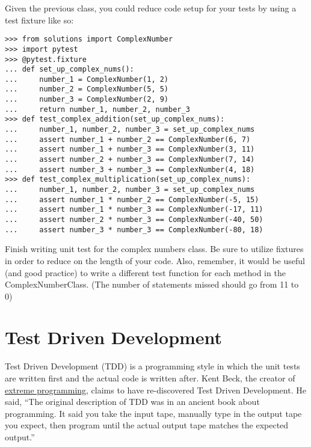 Given the previous class, you could reduce code setup for your tests by using a test fixture like so:

\begin{lstlisting}
>>> from solutions import ComplexNumber
>>> import pytest
>>> @pytest.fixture
... def set_up_complex_nums():
...     number_1 = ComplexNumber(1, 2)
...     number_2 = ComplexNumber(5, 5)
...     number_3 = ComplexNumber(2, 9)
...     return number_1, number_2, number_3
>>> def test_complex_addition(set_up_complex_nums):
...     number_1, number_2, number_3 = set_up_complex_nums
...     assert number_1 + number_2 == ComplexNumber(6, 7)
...     assert number_1 + number_3 == ComplexNumber(3, 11)
...     assert number_2 + number_3 == ComplexNumber(7, 14)
...     assert number_3 + number_3 == ComplexNumber(4, 18)
>>> def test_complex_multiplication(set_up_complex_nums):
...     number_1, number_2, number_3 = set_up_complex_nums
...     assert number_1 * number_2 == ComplexNumber(-5, 15)
...     assert number_1 * number_3 == ComplexNumber(-17, 11)
...     assert number_2 * number_3 == ComplexNumber(-40, 50)
...     assert number_3 * number_3 == ComplexNumber(-80, 18)
\end{lstlisting}

\begin{problem} %
Finish writing unit test for the complex numbers class. Be sure to utilize fixtures in order to reduce on the length of your code.
Also, remember, it would be useful (and good practice) to write a different test function for each method in the ComplexNumberClass.
(The number of statements missed should go from 11 to 0)
\end{problem}

\section*{Test Driven Development} %

Test Driven Development (TDD) is a programming style in which the unit tests are written first and the actual code is written after.
Kent Beck, the creator of \href{https://en.wikipedia.org/wiki/Extreme_programming}{extreme programming}, claims to have re-discovered  Test Driven Development. He said,
``The original description of TDD was in an ancient book about programming. It said you take the input tape, manually type in the output tape you expect, then program until the actual output tape matches the expected output.''

